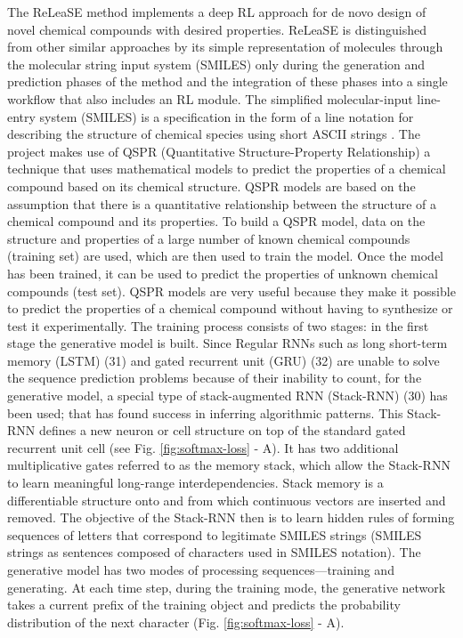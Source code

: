 \documentclass[conference]{IEEEtran}
\begin{document}
The ReLeaSE method implements a deep RL approach for de novo design of novel chemical compounds with desired properties. ReLeaSE is distinguished from other similar approaches by its simple representation of molecules through the molecular string input system (SMILES) only during the generation and prediction phases of the method and the integration of these phases into a single workflow that also includes an RL module. 
The simplified molecular-input line-entry system (SMILES) is a specification in the form of a line notation for describing the structure of chemical species using short ASCII strings \cite{simplified-molecular-input-line-entry-system}. 
The project makes use of QSPR (Quantitative Structure-Property Relationship) a technique that uses mathematical models to predict the properties of a chemical compound based on its chemical structure. QSPR models are based on the assumption that there is a quantitative relationship between the structure of a chemical compound and its properties. To build a QSPR model, data on the structure and properties of a large number of known chemical compounds (training set) are used, which are then used to train the model. Once the model has been trained, it can be used to predict the properties of unknown chemical compounds (test set). QSPR models are very useful because they make it possible to predict the properties of a chemical compound without having to synthesize or test it experimentally.
The training process consists of two stages: in the first stage the generative model is built.
Since Regular RNNs such as long short-term memory (LSTM) (31) and gated recurrent unit (GRU) (32) are unable to solve the sequence prediction problems because of their
inability to count, for the generative model, a special type of stack-augmented RNN (Stack-RNN) (30) has been used; that has found success in inferring algorithmic patterns. This Stack-RNN defines a new neuron or cell structure on top of the standard gated recurrent unit \cite{arxiv} cell (see Fig. \ref{fig:softmax-loss} - A). It has two additional multiplicative gates referred to as the memory stack, which allow the Stack-RNN to learn meaningful long-range interdependencies. Stack memory is a differentiable structure onto and from which continuous vectors are inserted and removed. The objective of the Stack-RNN then is to learn hidden rules of forming sequences of letters that correspond to legitimate SMILES strings (SMILES strings as sentences
composed of characters used in SMILES notation).
The generative model has two modes of processing sequences—training and generating.  
At each time step, during the training mode, the generative network takes a current prefix of the training object and predicts the probability distribution of the next character (Fig. \ref{fig:softmax-loss} - A). 
\end{document}
